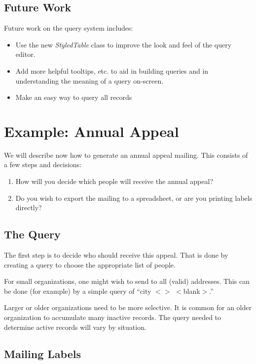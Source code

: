 \documentclass[11pt]{article}
\begin{document}
\subsection{Future Work}

Future work on the query system includes:

\begin{itemize}

\item Use the new \emph{StyledTable} class to improve the look and feel of the query editor.
\item Add more helpful tooltips, etc. to aid in building queries and in understanding the meaning of a query on-screen.

 \item Make an easy way to query all records
\end{itemize}

\section{Example: Annual Appeal}

We will describe now how to generate an annual appeal mailing.  This consists of a few steps and decisions:
 \begin{enumerate}
 \item How will you decide which people will receive the annual appeal?
 \item Do you wish to export the mailing to a spreadsheet, or are you printing labels directly?
 \end{enumerate}

\subsection{The Query}

The first step is to decide who should receive this appeal.  That is done by creating a query to choose the appropriate list of people.

For small organizations, one might wish to send to all (valid) addresses.  This can be done (for example) by a simple query of ``city $<>$ $<$blank$>$.''

Larger or older organizations need to be more selective.  It is common for an older organization to accumulate many inactive records.  The query needed to determine active records will vary by situation.

\subsection{Mailing Labels}
\end{document}
